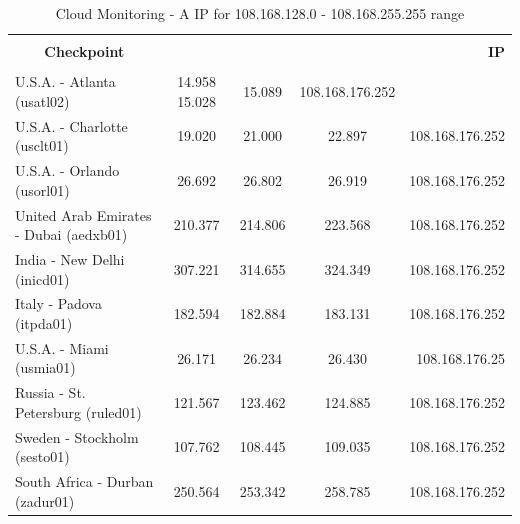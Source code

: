 \documentclass[a4paper,11pt]{book}
\begin{document}
\begin{table}
\label{table:Monitoring_1}
\begin{tabular}{|l|c|c|c|r|}
\hline
\multicolumn{1}{|c|}{\textbf{}} & {\textbf{}} & {\textbf{}} & {\textbf{}} & {\textbf{}}\\
\multicolumn{1}{|c|}{\textbf{Checkpoint}} & {\textbf{RTT minimo} & {\textbf{RTT medio} & {\textbf{RTT massimo} & {\textbf{IP}}\\
\multicolumn{1}{|c|}{\textbf{}} & {\textbf{}} & {\textbf{}} & {\textbf{}} & {\textbf{}}\\
\hline
U.S.A. - Atlanta (usatl02) & 14.958	15.028 & 15.089 & 108.168.176.252\\
U.S.A. - Charlotte (usclt01) & 19.020 & 21.000 & 22.897 & 108.168.176.252\\
U.S.A. - Orlando (usorl01) & 26.692 & 26.802 & 26.919 & 108.168.176.252\\
United Arab Emirates - Dubai (aedxb01) & 210.377 & 214.806 & 223.568 & 108.168.176.252\\
India - New Delhi (inicd01) & 307.221 & 314.655 & 324.349 & 108.168.176.252\\
Italy - Padova (itpda01) & 182.594 & 182.884 & 183.131 & 108.168.176.252\\
U.S.A. - Miami (usmia01) & 26.171 & 26.234 & 26.430 & 108.168.176.25\\
Russia - St. Petersburg (ruled01) & 121.567 & 123.462 & 124.885 & 108.168.176.252\\
Sweden - Stockholm (sesto01) & 107.762 & 108.445 & 109.035 & 108.168.176.252\\
South Africa - Durban (zadur01) & 250.564 & 253.342 & 258.785 & 108.168.176.252\\
\hline
\end{tabular}
\caption{Cloud Monitoring - A IP for 108.168.128.0 - 108.168.255.255 range}
\end{table}

~
\end{document}
